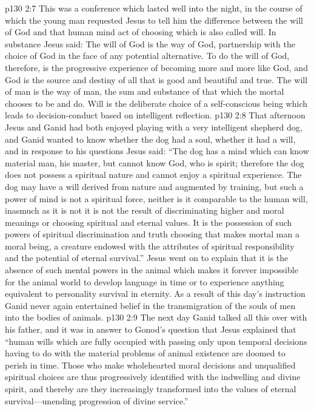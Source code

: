 \vs p130 2:7 This was a conference which lasted well into the night, in the course of which the young man requested Jesus to tell him the difference between the will of God and that human mind act of choosing which is also called will. In substance Jesus said: The will of God is the way of God, partnership with the choice of God in the face of any potential alternative. To do the will of God, therefore, is the progressive experience of becoming more and more like God, and God is the source and destiny of all that is good and beautiful and true. The will of man is the way of man, the sum and substance of that which the mortal chooses to be and do. Will is the deliberate choice of a self\hyp{}conscious being which leads to decision\hyp{}conduct based on intelligent reflection.
\vs p130 2:8 That afternoon Jesus and Ganid had both enjoyed playing with a very intelligent shepherd dog, and Ganid wanted to know whether the dog had a soul, whether it had a will, and in response to his questions Jesus said: \textcolor{ubdarkred}{“The dog has a mind which can know material man, his master, but cannot know God, who is spirit; therefore the dog does not possess a spiritual nature and cannot enjoy a spiritual experience. The dog may have a will derived from nature and augmented by training, but such a power of mind is not a spiritual force, neither is it comparable to the human will, inasmuch as it is not it is not the result of discriminating higher and moral meanings or choosing spiritual and eternal values. It is the possession of such powers of spiritual discrimination and truth choosing that makes mortal man a moral being, a creature endowed with the attributes of spiritual responsibility and the potential of eternal survival.”} Jesus went on to explain that it is the absence of such mental powers in the animal which makes it forever impossible for the animal world to develop language in time or to experience anything equivalent to personality survival in eternity. As a result of this day’s instruction Ganid never again entertained belief in the transmigration of the souls of men into the bodies of animals.
\pc \vs p130 2:9 The next day Ganid talked all this over with his father, and it was in answer to Gonod’s question that Jesus explained that \textcolor{ubdarkred}{“human wills which are fully occupied with passing only upon temporal decisions having to do with the material problems of animal existence are doomed to perish in time. Those who make wholehearted moral decisions and unqualified spiritual choices are thus progressively identified with the indwelling and divine spirit, and thereby are they increasingly transformed into the values of eternal survival---unending progression of divine service.”}
